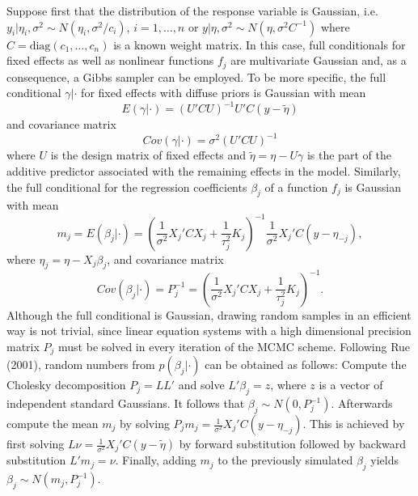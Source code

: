 \documentclass[11pt,a4paper,twoside]{bayesxarticle}
\newcommand{\diag}{\mbox{diag}}
\begin{document}
Suppose first that the distribution of the response variable is
Gaussian, i.e. $y_i | \eta_i, \sigma^2 \sim N(\eta_i,\sigma^2/c_i)$,
$i=1,\dots,n$ or $y | \eta, \sigma^2 \sim N(\eta,\sigma^2 C^{-1})$
where $C = \diag(c_1,\dots,c_n)$ is a known weight matrix. In this
case, full conditionals for fixed effects as well as nonlinear
functions $f_j$ are multivariate Gaussian and, as a consequence, a
Gibbs sampler can be employed. To be more specific, the full
conditional $\gamma | \cdot$ for fixed effects with diffuse priors
is Gaussian with mean
\begin{equation}\label{meanfixed}
 E(\gamma | \cdot) = (U'C U)^{-1}U'C(y-\tilde{\eta})
\end{equation}
and covariance matrix
\begin{equation}
\label{covfixed} Cov(\gamma | \cdot ) = \sigma^2 (U'CU)^{-1}
\end{equation}
where $U$ is the design matrix of fixed effects and
$\tilde{\eta}=\eta-U\gamma$ is the part of the additive predictor
associated with the remaining effects in the model. Similarly, the
full conditional for the regression coefficients $\beta_j$ of a
function $f_j$ is Gaussian with mean
\begin{equation}
\label{meangaussian} m_j = E(\beta_j | \cdot) = \left(
\frac{1}{\sigma^2} X_j' C X_j + \frac{1}{\tau_j^2} K_j \right)^{-1}
\frac{1}{\sigma^2}X_j'C(y-\eta_{-j}),
\end{equation}
where $\eta_j=\eta-X_j\beta_j$, and covariance matrix
\begin{equation}
\label{covgaussian} Cov(\beta_j | \cdot) = P_j^{-1} = \left(
\frac{1}{\sigma^2} X_j'CX_j + \frac{1}{\tau_j^2} K_j \right)^{-1}.
\end{equation}
Although the full conditional is Gaussian, drawing random samples in
an efficient way is not trivial, since linear equation systems with
a high dimensional precision matrix $P_j$ must be solved in every
iteration of the MCMC scheme. Following Rue (2001), random numbers
from $p(\beta_j | \cdot)$ can be obtained as follows: Compute the
Cholesky decomposition $P_j = L L'$ and solve $L' \beta_j = z$,
where $z$ is a vector of independent standard Gaussians. It follows
that $\beta_j \sim N(0,P_j^{-1})$. Afterwards compute the mean $m_j$
by solving $P_j m_j = \frac{1}{\sigma^2} X_j'C(y-\eta_{-j})$. This
is achieved by first solving $L \nu = \frac{1}{\sigma^2}
X_j'C(y-\tilde{\eta})$ by forward substitution followed by backward
substitution $L' m_j = \nu$. Finally, adding $m_j$ to the previously
simulated $\beta_j$ yields $\beta_j \sim N(m_j,P_j^{-1})$.
\end{document}
